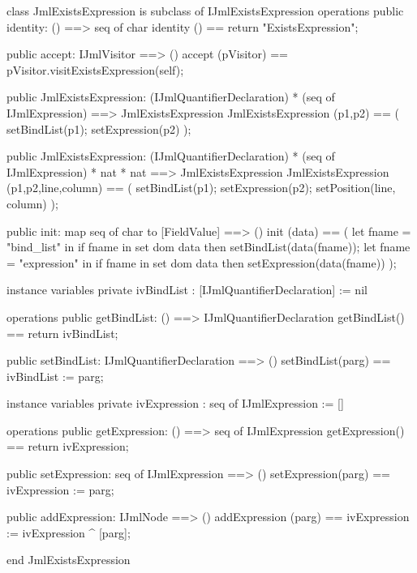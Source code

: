 \begin{vdm_al}
class JmlExistsExpression is subclass of IJmlExistsExpression
operations
  public identity: () ==> seq of char
  identity () == return "ExistsExpression";

  public accept: IJmlVisitor ==> ()
  accept (pVisitor) == pVisitor.visitExistsExpression(self);

  public JmlExistsExpression:
    (IJmlQuantifierDeclaration) *
    (seq of IJmlExpression) ==> JmlExistsExpression
  JmlExistsExpression (p1,p2) == 
    ( setBindList(p1);
      setExpression(p2) );

  public JmlExistsExpression:
    (IJmlQuantifierDeclaration) *
    (seq of IJmlExpression) *
    nat *
    nat ==> JmlExistsExpression
  JmlExistsExpression (p1,p2,line,column) == 
    ( setBindList(p1);
      setExpression(p2);
      setPosition(line, column) );

  public init: map seq of char to [FieldValue] ==> ()
  init (data) ==
    ( let fname = "bind_list" in
        if fname in set dom data
        then setBindList(data(fname));
      let fname = "expression" in
        if fname in set dom data
        then setExpression(data(fname)) );

instance variables
  private ivBindList : [IJmlQuantifierDeclaration] := nil

operations
  public getBindList: () ==> IJmlQuantifierDeclaration
  getBindList() == return ivBindList;

  public setBindList: IJmlQuantifierDeclaration ==> ()
  setBindList(parg) == ivBindList := parg;

instance variables
  private ivExpression : seq of IJmlExpression := []

operations
  public getExpression: () ==> seq of IJmlExpression
  getExpression() == return ivExpression;

  public setExpression: seq of IJmlExpression ==> ()
  setExpression(parg) == ivExpression := parg;

  public addExpression: IJmlNode ==> ()
  addExpression (parg) == ivExpression := ivExpression ^ [parg];

end JmlExistsExpression
\end{vdm_al}

